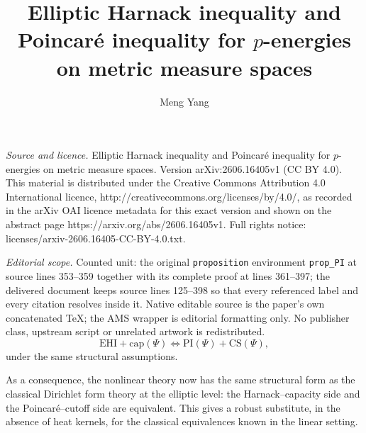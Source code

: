 \documentclass[10pt,a4paper]{amsart}
\numberwithin{equation}{section}
\begin{document}
\title[Elliptic Harnack inequality and Poincar'e inequality for p-e]{Elliptic Harnack inequality and Poincar\'e inequality for $p$-energies on metric measure spaces}
\author{Meng Yang}
\date{}
\maketitle
\noindent\emph{Source and licence.} Elliptic Harnack inequality and Poincar\'e inequality for $p$-energies on metric measure spaces. Version arXiv:2606.16405v1 (CC BY 4.0). This material is distributed under the Creative Commons Attribution 4.0 International licence, http://creativecommons.org/licenses/by/4.0/, as recorded in the arXiv OAI licence metadata for this exact version and shown on the abstract page https://arxiv.org/abs/2606.16405v1. Full rights notice: licenses/arxiv-2606.16405-CC-BY-4.0.txt.\par\smallskip
\noindent\textit{Editorial scope.} Counted unit: the original \texttt{proposition} environment \texttt{prop\_PI} at source lines 353--359 together with its complete proof at lines 361--397; the delivered document keeps source lines 125--398 so that every referenced label and every citation resolves inside it. Native editable source is the paper's own concatenated TeX; the AMS wrapper is editorial formatting only. No publisher class, upstream script or unrelated artwork is redistributed.
\begin{equation}\label{eq_equiv}
\text{EHI}+\text{cap}(\Psi)\Leftrightarrow\text{PI}(\Psi)+\text{CS}(\Psi),
\end{equation}
under the same structural assumptions.

As a consequence, the nonlinear theory now has the same structural form as the classical Dirichlet form theory at the elliptic level: the Harnack--capacity side and the Poincar\'e--cutoff side are equivalent. This gives a robust substitute, in the absence of heat kernels, for the classical equivalences known in the linear setting.
\end{document}
